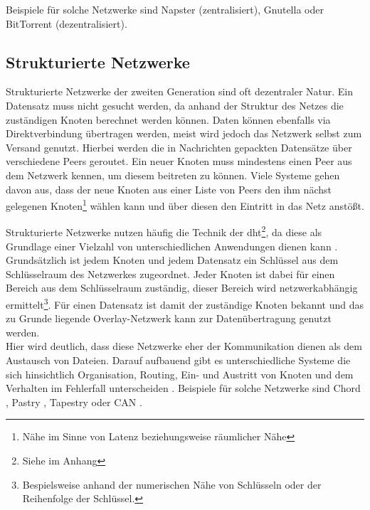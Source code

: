 Beispiele für solche Netzwerke sind Napster (zentralisiert), Gnutella oder BitTorrent (dezentralisiert).

\subsection{Strukturierte Netzwerke}
Strukturierte Netzwerke der zweiten Generation sind oft dezentraler Natur. Ein Datensatz muss nicht gesucht werden, da anhand der Struktur des Netzes die zuständigen Knoten berechnet werden können. Daten können ebenfalls via Direktverbindung übertragen werden, meist wird jedoch das Netzwerk selbst zum Versand genutzt. Hierbei werden die in Nachrichten gepackten Datensätze über verschiedene Peers geroutet. Ein neuer Knoten muss mindestens einen Peer aus dem Netzwerk kennen, um diesem beitreten zu können. Viele Systeme gehen davon aus, dass der neue Knoten aus einer Liste von Peers den ihm nächst gelegenen Knoten\footnote{Nähe im Sinne von Latenz beziehungsweise räumlicher Nähe} wählen kann und über diesen den Eintritt in das Netz anstößt.

Strukturierte Netzwerke nutzen häufig die Technik der \acf{dht}\footnote{Siehe  im Anhang}, da diese als Grundlage einer Vielzahl von unterschiedlichen Anwendungen dienen kann \cite{Wehrle2005, Ghodsi2006AlgorithmsDHT}. Grundsätzlich ist jedem Knoten und jedem Datensatz ein Schlüssel aus dem Schlüsselraum des Netzwerkes zugeordnet. Jeder Knoten ist dabei für einen Bereich aus dem Schlüsselraum zuständig, dieser Bereich wird netzwerkabhängig ermittelt\footnote{Bespielsweise anhand der numerischen Nähe von Schlüsseln oder der Reihenfolge der Schlüssel.}. Für einen Datensatz ist damit der zuständige Knoten bekannt und das zu Grunde liegende Overlay-Netzwerk kann zur Datenübertragung genutzt werden.\\
Hier wird deutlich, dass diese Netzwerke eher der Kommunikation dienen als dem Austausch von Dateien. Darauf aufbauend gibt es unterschiedliche Systeme die sich hinsichtlich Organisation, Routing, Ein- und Austritt von Knoten und dem Verhalten im Fehlerfall unterscheiden \cite{Goetz2005, Lua2005Survey}. Beispiele für solche Netzwerke sind Chord \cite{Hosseini2007Survey}, Pastry \cite{Rowstron2001}, Tapestry \cite{Zhao2001Tapestry,Zhao2004Tapestry} oder CAN \cite{Ratnasamy2001Scalable}. 

